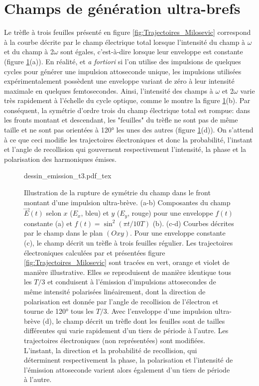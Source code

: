 \section{Champs de génération ultra-brefs}
\label{sec:ChampsBrefs}
Le trèfle à trois feuilles présenté en figure \ref{fig:Trajectoires_Milosevic} correspond à la courbe décrite par le champ électrique total lorsque l'intensité du champ à $\omega$ et du champ à 2$\omega$ sont égales, c'est-à-dire lorsque leur enveloppe est constante (figure \ref{fig:dessin_emission_t3}(a)). En réalité, et \textit{a fortiori} si l'on utilise des impulsions de quelques cycles pour générer une impulsion attoseconde unique, les impulsions utilisées expérimentalement possèdent une enveloppe variant de zéro à leur intensité maximale en quelques femtosecondes. Ainsi, l'intensité des champs à $\omega$ et 2$\omega$ varie très rapidement à l'échelle du cycle optique, comme le montre la figure \ref{fig:dessin_emission_t3}(b). Par conséquent, la symétrie d'ordre trois du champ électrique total est rompue: dans les fronts montant et descendant, les "feuilles" du trèfle ne sont pas de même taille et ne sont pas orientées à 120° les unes des autres (figure \ref{fig:dessin_emission_t3}(d)). On s'attend à ce que ceci modifie les trajectoires électroniques et donc la probabilité, l'instant et l'angle de recollision qui gouvernent respectivement l'intensité, la phase et la polarisation des harmoniques émises.

\begin{figure}
\centering
\def\svgwidth{\textwidth}
{dessin_emission_t3.pdf_tex}
\caption{Illustration de la rupture de symétrie du champ dans le front montant d'une impulsion ultra-brève. (a-b) Composantes du champ $\vec{E}(t)$ selon $x$ ($E_x$, bleu) et $y$ ($E_y$, rouge) pour une enveloppe  $f(t)$ constante (a) et $f(t) = \sin^2 (\pi t / 10 T)$ (b). (c-d) Courbes décrites par le champ dans le plan $(Oxy)$. Pour une enveloppe constante (c), le champ décrit un trèfle à trois feuilles régulier. Les trajectoires électroniques calculées par  et présentées figure \ref{fig:Trajectoires_Milosevic} sont tracées en vert, orange et violet de manière illustrative. Elles se reproduisent de manière identique tous les $T/3$ et conduisent à l'émission d'impulsions attosecondes de même intensité polarisées linéairement, dont la direction de polarisation est donnée par l'angle de recollision de l'électron et tourne de 120° tous les $T/3$. Avec l'enveloppe d'une impulsion ultra-brève (d), le champ décrit un trèfle dont les feuilles sont de tailles différentes qui varie rapidement d'un tiers de période à l'autre. Les trajectoires électroniques (non représentées) sont modifiées. L'instant, la direction et la probabilité de recollision, qui déterminent respectivement la phase, la polarisation et l'intensité de l'émission attoseconde varient alors également d'un tiers de période à l'autre.}
\label{fig:dessin_emission_t3}
\end{figure}

